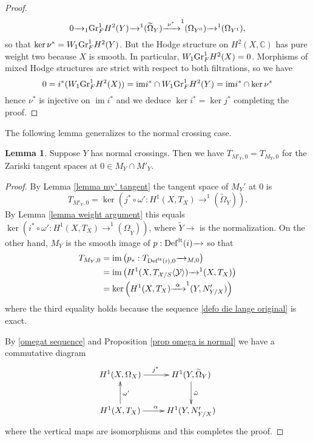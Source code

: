 \documentclass[a4paper,11pt,final]{amsart}
\theoremstyle{plain}
\theoremstyle{definition}
\newtheorem{lemma}[subsection]{Lemma}
\numberwithin{equation}{section}
\theoremstyle{remark}
\begin{document}
\begin{proof}
\[
0{\xrightarrow{\ \ }}_1 {{\rm Gr}}_F^1 H^2(Y) {\xrightarrow{\ \ }}^1({\widetilde{\Omega}}_Y) {\xrightarrow{\ \nu^*\ }}^1(\Omega_{Y^{0}}){\xrightarrow{\ \ }}^1(\Omega_{Y^{1}}),
\]
so that $\ker \nu^* =  W_1 {{\rm Gr}}_F^1 H^2(Y)$. But the Hodge structure on $H^2(X,{{\mathbb C}})$ has pure weight two because $X$ is smooth. In particular, $W_1{{\rm Gr}}_F^1 H^2(X) = 0$. Morphisms of mixed Hodge structures are strict with respect to both filtrations, so we have
\[
0 = i^*(W_1{{\rm Gr}}_F^1H^2(X)) = {\operatorname{im}} i^* \cap W_1{{\rm Gr}}_F^1 H^2(Y) = {\operatorname{im}} i^*\cap \ker \nu^*
\]
hence $\nu^*$ is injective on ${\operatorname{im}} i^*$ and we deduce $\ker i^* = \ker j^*$ completing the proof.
\end{proof}
The following lemma generalizes \cite[Lem 2.3]{Vo92} to the normal crossing case.
\begin{lemma}\label{tisequal}
Suppose $Y$ has  normal crossings. Then we have $T_{M'_Y,0} = T_{M_Y,0}$ for the Zariski tangent spaces at $0 \in M_Y \cap M'_{Y}$.
\end{lemma}
\begin{proof}
By Lemma \ref{lemma my' tangent} the tangent space of $M_Y'$ at $0$ is
\[
T_{M'_Y,0}= \ker \left(j^* \circ \omega':H^1(X,T_X){\xrightarrow{\ \ }}^1({\widetilde{\Omega}}_Y)\right).
\]
By Lemma \ref{lemma weight argument} this equals $\ker \left(i^* \circ \omega':H^1(X,T_X){\xrightarrow{\ \ }}^1(\Omega_{{\widetilde{Y}}})\right)$,
where ${{\widetilde{Y}}}{\xrightarrow{\ \ }}$ is the normalization. On the other hand, $M_Y$ is the smooth image of $p:{{\operatorname{Def}}}^{{\rm{lt}}}(i){\xrightarrow{\ \ }}$ so that
\begin{align*}
T_{M_Y,0} &={\operatorname{im}} \left(p_*: T_{{{\operatorname{Def}}}^{{\rm{lt}}}(i),0}{\xrightarrow{\ \ }}_{M,0}\right)\\
 &= {\operatorname{im}} \left(H^1(X,T_{{{\mathcal X}}/S}\langle {{\mathcal Y}}\rangle) {\xrightarrow{\ \ }}^1(X,T_X)\right) \\
 &= \ker\left(H^1(X,T_X){\xrightarrow{\ \alpha\ }}^1(Y,N'_{Y/X})\right)
\end{align*}
where the third equality holds because the sequence \eqref{defo die lange original} is exact. 

By \eqref{omegat sequence} and Proposition \ref{prop omega is normal} we have a commutative diagram
\begin{equation*}
\begin{xy}
\xymatrix{
H^1(X,\Omega_{X})\ar[r]^{j^*}& H^1(Y,{\widetilde{\Omega}}_Y) \ar[d]^{\tilde{\omega}}\\
H^1(X,T_X)\ar[u]_{\omega'}\ar[r]^\alpha& H^1(Y,N'_{Y/X})\\
}
\end{xy}
\end{equation*}
where the vertical maps are isomorphisms and this completes the proof.
\end{proof}
\end{document}
